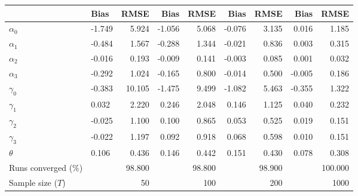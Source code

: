 
\begin{tabular}[t]{llrrrrrrr}
\toprule
  & Bias & RMSE & Bias & RMSE & Bias & RMSE & Bias & RMSE\\
\midrule
$\alpha_{0}$ & -1.749 & 5.924 & -1.056 & 5.068 & -0.076 & 3.135 & 0.016 & 1.185\\
$\alpha_{1}$ & -0.484 & 1.567 & -0.288 & 1.344 & -0.021 & 0.836 & 0.003 & 0.315\\
$\alpha_{2}$ & -0.016 & 0.193 & -0.009 & 0.141 & -0.003 & 0.085 & 0.001 & 0.032\\
$\alpha_{3}$ & -0.292 & 1.024 & -0.165 & 0.800 & -0.014 & 0.500 & -0.005 & 0.186\\
$\gamma_{0}$ & -0.383 & 10.105 & -1.475 & 9.499 & -1.082 & 5.463 & -0.355 & 1.322\\
$\gamma_{1}$ & 0.032 & 2.220 & 0.246 & 2.048 & 0.146 & 1.125 & 0.040 & 0.232\\
$\gamma_{2}$ & -0.025 & 1.100 & 0.100 & 0.865 & 0.053 & 0.525 & 0.019 & 0.151\\
$\gamma_{3}$ & -0.022 & 1.197 & 0.092 & 0.918 & 0.068 & 0.598 & 0.010 & 0.151\\
$\theta$ & 0.106 & 0.436 & 0.146 & 0.442 & 0.151 & 0.430 & 0.078 & 0.308\\
Runs converged (\%) &  & 98.800 &  & 98.800 &  & 98.900 &  & 100.000\\
Sample size ($T$) &  & 50 &  & 100 &  & 200 &  & 1000\\
\bottomrule
\end{tabular}
